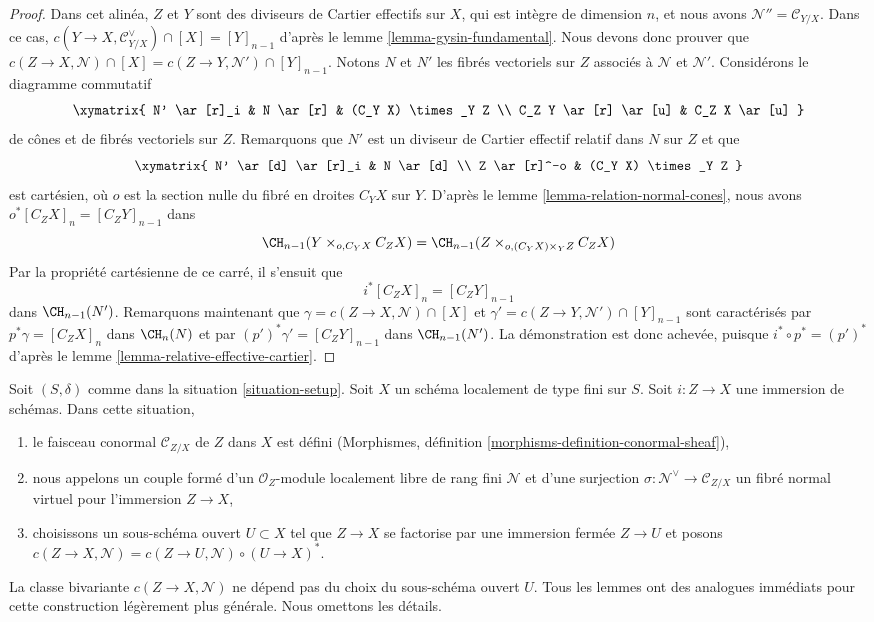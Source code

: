 \begin{proof}
\medskip\noindent
Dans cet alinéa, $Z$ et $Y$ sont des diviseurs de Cartier effectifs sur $X$,
qui est intègre de dimension $n$, et nous avons $\mathcal{N}'' = \mathcal{C}_{Y/X}$.
Dans ce cas, $c(Y \to X, \mathcal{C}_{Y/X}^\vee) \cap [X] = [Y]_{n - 1}$ d'après le
lemme \ref{lemma-gysin-fundamental}. Nous devons donc prouver que
$c(Z \to X, \mathcal{N}) \cap [X] = c(Z \to Y, \mathcal{N}') \cap [Y]_{n - 1}$.
Notons $N$ et $N'$ les fibrés vectoriels sur $Z$ associés à
$\mathcal{N}$ et $\mathcal{N}'$. Considérons le diagramme commutatif
$$
\xymatrix{
N' \ar[r]_i &
N \ar[r] &
(C_Y X) \times_Y Z \\
C_Z Y \ar[r] \ar[u] &
C_Z X \ar[u]
}
$$
de cônes et de fibrés vectoriels sur $Z$. Remarquons que $N'$ est un
diviseur de Cartier effectif relatif dans $N$ sur $Z$ et que
$$
\xymatrix{
N' \ar[d] \ar[r]_i & N \ar[d] \\
Z \ar[r]^-o & (C_Y X) \times_Y Z
}
$$
est cartésien, où $o$ est la section nulle du fibré en droites
$C_Y X$ sur $Y$. D'après le
lemme \ref{lemma-relation-normal-cones}, nous avons $o^*[C_ZX]_n = [C_Z Y]_{n - 1}$
dans
$$
\CH_{n - 1}(Y \times_{o, C_Y X} C_ZX) =
\CH_{n - 1}(Z \times_{o, (C_Y X) \times_Y Z} C_ZX)
$$
Par la propriété cartésienne de
ce carré, il s'ensuit que
$$
i^*[C_ZX]_n = [C_Z Y]_{n - 1}
$$
dans $\CH_{n - 1}(N')$. Remarquons maintenant que
$\gamma = c(Z \to X, \mathcal{N}) \cap [X]$ et
$\gamma' = c(Z \to Y, \mathcal{N}') \cap [Y]_{n - 1}$
sont caractérisés par $p^*\gamma = [C_Z X]_n$ dans $\CH_n(N)$
et par $(p')^*\gamma' = [C_Z Y]_{n - 1}$ dans $\CH_{n - 1}(N')$.
La démonstration est donc achevée, puisque $i^* \circ p^* = (p')^*$ d'après le
lemme \ref{lemma-relative-effective-cartier}.
\end{proof}

\begin{remark}
\label{remark-gysin-for-immersion}
Soit $(S, \delta)$ comme dans la situation \ref{situation-setup}.
Soit $X$ un schéma localement de type fini sur $S$.
Soit $i : Z \to X$ une immersion de schémas.
Dans cette situation,
\begin{enumerate}
\item le faisceau conormal $\mathcal{C}_{Z/X}$
de $Z$ dans $X$ est défini
(Morphismes, définition \ref{morphisms-definition-conormal-sheaf}),
\item nous appelons un couple formé d'un $\mathcal{O}_Z$-module localement libre de rang fini
$\mathcal{N}$ et d'une surjection $\sigma : \mathcal{N}^\vee \to \mathcal{C}_{Z/X}$
un fibré normal virtuel pour l'immersion $Z \to X$,
\item choisissons un sous-schéma ouvert $U \subset X$ tel que $Z \to X$
se factorise par une immersion fermée $Z \to U$ et posons
$c(Z \to X, \mathcal{N}) = c(Z \to U, \mathcal{N}) \circ (U \to X)^*$.
\end{enumerate}
La classe bivariante $c(Z \to X, \mathcal{N})$ ne dépend pas du choix
du sous-schéma ouvert $U$. Tous les lemmes ont des analogues immédiats
pour cette construction légèrement plus générale. Nous omettons les détails.
\end{remark}







